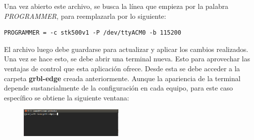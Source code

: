 \documentclass{article}
\begin{document}
\begin{multicols}{2}
\begin{enumerate}
Una vez abierto este archivo, se busca la línea que empieza por la palabra \textit{PROGRAMMER}, para reemplazarla por lo siguiente:
\begin{lstlisting}
PROGRAMMER = -c stk500v1 -P /dev/ttyACM0 -b 115200 
\end{lstlisting}
El archivo luego debe guardarse para actualizar y aplicar los cambios realizados. Una vez se hace esto, se debe abrir una terminal nueva. Esto para aprovechar las ventajas de control que esta aplicación ofrece. Desde esta se debe acceder a la carpeta \textbf{grbl-edge} creada anteriormente. Aunque la apariencia de la terminal depende sustancialmente de la configuración en cada equipo, para este caso específico se obtiene la siguiente ventana:

\begin{figure}[H]
\centering
\includegraphics[width=0.45\textwidth]{Terminal.png}
\label{fig:Carpeta}
\end{figure}


\end{enumerate}
\end{multicols}
\end{document}

